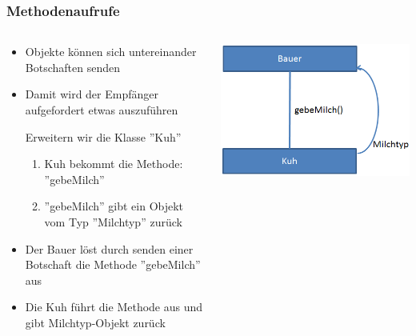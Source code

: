 \begin{frame}
\frametitle{Methodenaufrufe}
\begin{columns}
	    \begin{column}{.6\textwidth}
			\small
			\begin{itemize}
			  \item Objekte k\"onnen sich untereinander Botschaften senden
			  \item Damit wird der Empf\"anger aufgefordert etwas auszuf\"uhren
			  \begin{item}
			  		Erweitern wir die Klasse ''Kuh''
					\begin{enumerate}
					  \item \tiny Kuh bekommt die Methode: ''gebeMilch''
					  \item \tiny ''gebeMilch'' gibt ein Objekt vom Typ ''Milchtyp'' zur\"uck
					\end{enumerate}
			  \end{item}
			  \item Der Bauer l\"ost durch senden einer Botschaft die Methode
			  ''gebeMilch'' aus
			  \item Die Kuh f\"uhrt die Methode aus und gibt Milchtyp-Objekt zur\"uck
			\end{itemize}
			\normalsize
	    \end{column}
	    \begin{column}{.4\textwidth}
	   		\center
			\includegraphics[width=1\textwidth,
			keepaspectratio=true]{bilder/methodenaufruf.png}
	    \end{column}
	\end{columns} 
\end{frame}
 
